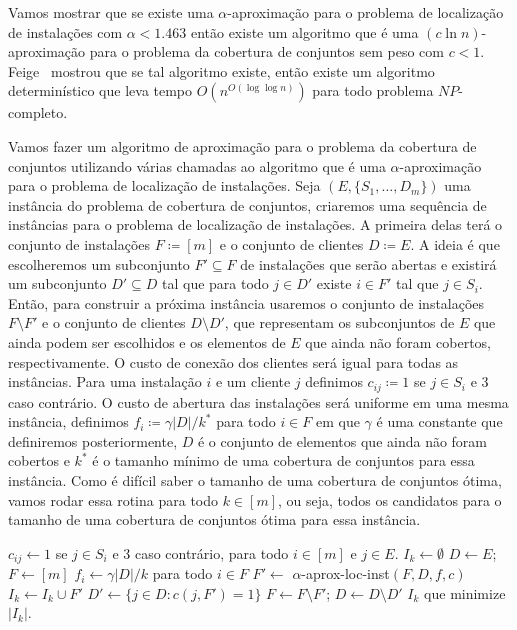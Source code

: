 Vamos mostrar que se existe uma $\alpha$-aproximação para o problema de localização de instalações com $\alpha < 1.463$ então existe um algoritmo que é uma $(c \ln n)$-aproximação para o problema da cobertura de conjuntos sem peso com $c<1$. 
Feige~\cite{Feige98} mostrou que se tal algoritmo existe, então existe um algoritmo determinístico que leva tempo $O(n^{O(\log\log n)})$ para todo problema $NP$-completo.

Vamos fazer um algoritmo de aproximação para o problema da cobertura de conjuntos utilizando várias chamadas ao algoritmo que é uma $\alpha$-aproximação para o problema de localização de instalações. 
Seja $(E,\{S_1,\ldots,D_m\})$ uma instância do problema de cobertura de conjuntos, criaremos uma sequência de instâncias para o problema de localização de instalações. 
A primeira delas terá o conjunto de instalações $F \coloneqq [m]$ e o conjunto de clientes $D \coloneqq E$. 
A ideia é que escolheremos um subconjunto $F' \subseteq F$ de instalações que serão abertas e existirá um subconjunto $D' \subseteq D$ tal que para todo $j \in D'$ existe $i \in F'$ tal que $j \in S_i$. 
Então, para construir a próxima instância usaremos o conjunto de instalações $F \setminus F'$ e o conjunto de clientes $D \setminus D'$, que representam os subconjuntos de $E$ que ainda podem ser escolhidos e os elementos de $E$ que ainda não foram cobertos, respectivamente. 
O custo de conexão dos clientes será igual para todas as instâncias. Para uma instalação $i$ e um cliente $j$ definimos $c_{ij}\coloneqq 1$ se $j \in S_i$ e $3$ caso contrário.
O custo de abertura das instalações será uniforme em uma mesma instância, definimos $f_i \coloneqq \gamma |D|/k^*$ para todo $i\in F$ em que $\gamma$ é uma constante que definiremos posteriormente, $D$ é o conjunto de elementos que ainda não foram cobertos e $k^*$ é o tamanho mínimo de uma cobertura de conjuntos para essa instância. Como é difícil saber o tamanho de uma cobertura de conjuntos ótima, vamos rodar essa rotina para todo $k \in [m]$, ou seja, todos os candidatos para o  tamanho de uma cobertura de conjuntos ótima para essa instância.

\begin{algorithm}
    \caption{}
    \begin{algorithmic}[1]
        \State $c_{ij} \gets 1$ se $j \in S_i$ e 3 caso contrário, para todo $i \in [m]$ e $j \in E$.
            \State $I_k \gets \emptyset$
            \State $D \gets E$; $F \gets [m]$
                \State $f_i \gets \gamma |D|/k$ para todo $i \in F$
                \State $F' \gets$ {\sc $\alpha$-aprox-loc-inst}$(F,D,f,c)$
                \State $I_k \gets I_k \cup F'$
                \State $D' \gets \{j \in D: c(j,F') = 1 \}$
                \State $F \gets F \setminus F'$; $D\gets D\setminus D'$
            \EndWhile
        \EndFor
    \State \Return $I_k$ que minimize $|I_k|$.
    \end{algorithmic}
\end{algorithm}


